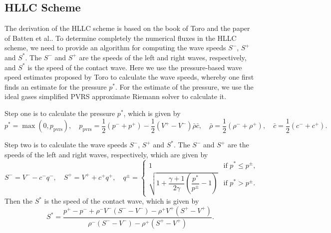 \documentclass{develop-note}
\begin{document}
\subsection*{HLLC Scheme}

The derivation of the HLLC scheme is based on the book of Toro\cite{toroRiemannSolversNumerical2009a} and the paper of Batten et al.\cite{battenChoiceWavespeedsHLLC1997}. To determine completely the numerical fluxes in the HLLC scheme, we need to provide an algorithm for computing the wave speeds $S^{-}$, $S^{+}$ and $S^{*}$. The $S^{-}$ and $S^{+}$ are the speeds of the left and right waves, respectively, and $S^{*}$ is the speed of the contact wave. Here we use the pressure-based wave speed estimates proposed by Toro to calculate the wave speeds, whereby one first finds an estimate for the pressure $p^{*}$. For the estimate of the pressure, we use the ideal gases simplified PVRS approximate Riemann solver to calculate it.

Step one is to calculate the pressure $p^{*}$, which is given by
\begin{equation}
  p^{*}=\max(0, p_{\mathrm{pvrs}}),\quad p_{\mathrm{pvrs}}=\dfrac{1}{2}(p^{-}+p^{+})-\dfrac{1}{2}(V^{+}-V^{-})\bar{\rho}\bar{c},\quad\bar{\rho}=\dfrac{1}{2}(\rho^{-}+\rho^{+}),\quad\bar{c}=\dfrac{1}{2}(c^{-}+c^{+}).
\end{equation}

Step two is to calculate the wave speeds $S^{-}$, $S^{+}$ and $S^{*}$. The $S^{-}$ and $S^{+}$ are the speeds of the left and right waves, respectively, which are given by
\begin{equation}
  S^{-}=V^{-}-c^{-}q^{-},\quad S^{+}=V^{+}+c^{+}q^{+},\quad q^{\pm}=
  \begin{cases}
    1&\text{if }p^{*}\leqslant p^{\pm},\\
    \sqrt{1+\dfrac{\gamma+1}{2\gamma}\left(\dfrac{p^{*}}{p^{\pm}}-1\right)}&\text{if }p^{*}>p^{\pm}.
  \end{cases}
\end{equation}
Then the $S^{*}$ is the speed of the contact wave, which is given by
\begin{equation}
  S^{*}=\dfrac{p^{+}-p^{-}+\rho^{-}V^{-}(S^{-}-V^{-})-\rho^{+}V^{+}(S^{+}-V^{+})}{\rho^{-}(S^{-}-V^{-})-\rho^{+}(S^{+}-V^{+})}.
\end{equation}
\end{document}
